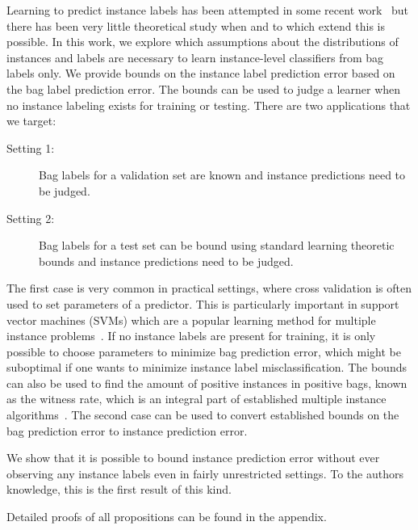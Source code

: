Learning to predict instance labels has been attempted in some recent work~\citep{liconvex2010,zhang2002dd}
but there has been very little theoretical study when and to which extend this is possible.
In this work, we explore which assumptions about the distributions of instances and labels
are necessary to learn instance-level classifiers from bag labels only.
We provide bounds on the instance label prediction error based on the
bag label prediction error. The bounds can be used to judge a learner when no
instance labeling exists for training or testing.
There are two applications that we target:
\begin{description}
\item[Setting 1:] Bag labels for a validation set are known and instance predictions need to be judged.
\item[Setting 2:] Bag labels for a test set can be bound using standard learning theoretic bounds and instance
predictions need to be judged.
\end{description}
The first case is very common in practical settings, where
cross validation is often used to set parameters of a predictor. This is
particularly important in support vector machines (SVMs) which are a popular
learning method for multiple instance problems~\citep{andrews2003support}.
If no instance labels are present for training, it is only possible to
choose parameters to minimize bag prediction error, which might be suboptimal if one
wants to minimize instance label misclassification. 
The bounds can also be used to find the amount of positive instances in positive bags,
known as the witness rate, which is an integral part of established multiple
instance algorithms~\citep{zhang2002dd,liconvex2010}.
The second case can be used to convert established bounds on the bag prediction error
to instance prediction error.

We show that it is possible to bound instance prediction error without
ever observing any instance labels even in fairly unrestricted settings.
To the authors knowledge, this is the first result of this kind.

Detailed proofs of all propositions can be found in the appendix.

